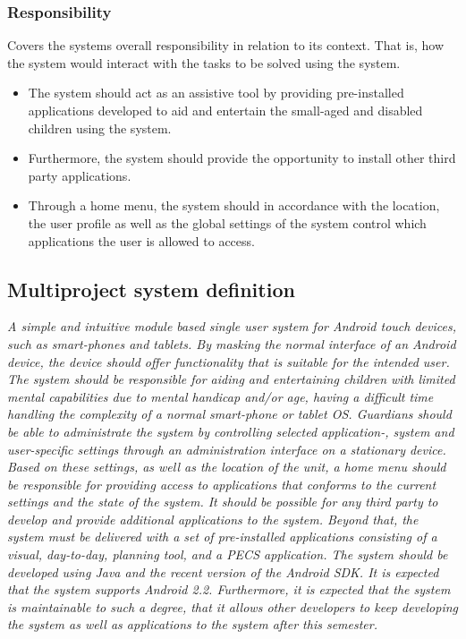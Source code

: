 \subsubsection{Responsibility} 
Covers the systems overall responsibility in relation to its context. That is, how the system would interact with the tasks to be solved using the system.
\begin{itemize}
	\item The system should act as an assistive tool by providing pre-installed applications developed to aid and entertain the small-aged and disabled children using the system. 
	\item Furthermore, the system should provide the opportunity to install other third party applications. 
	\item Through a home menu, the system should in accordance with the location, the user profile as well as the global settings of the system control which applications the user is allowed to access.
\end{itemize}

\subsection{Multiproject system definition}

\textit{A simple and intuitive module based single user system for Android touch devices, such as smart-phones and tablets. By masking the normal interface of an Android device, the device should offer functionality that is suitable for the intended user.
The system should be responsible for aiding and entertaining children with limited mental capabilities due to mental handicap and/or age, having a difficult time handling the complexity of a normal smart-phone or tablet OS. Guardians should be able to administrate the system by controlling selected application-, system and user-specific settings through an administration interface on a stationary device. Based on these settings, as well as the location of the unit, a home menu should be responsible for providing access to applications that conforms to the current settings and the state of the system. It should be possible for any third party to develop and provide additional applications to the system. Beyond that, the system must be delivered with a set of pre-installed applications consisting of a visual, day-to-day, planning tool, and a PECS application. The system should be developed using Java and the recent version of the Android SDK. It is expected that the system supports Android 2.2. Furthermore, it is expected that the system is maintainable to such a degree, that it allows other developers to keep developing the system as well as applications to the system after this semester.}\cite{giraffactors}

